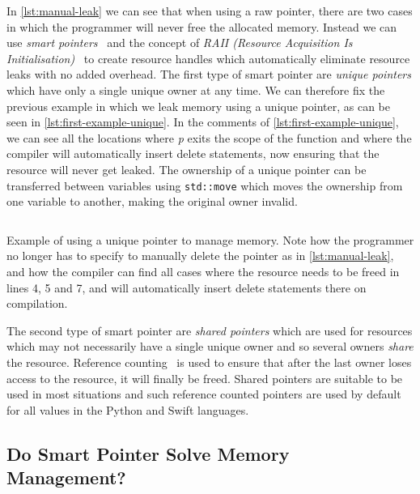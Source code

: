 \documentclass{proposal}
\begin{document}

    In \autoref{lst:manual-leak} we can see that when using a raw pointer, there are two cases in which the programmer will never free the allocated memory.
    Instead we can use \emph{smart pointers}~\cite{Dimov2003} and the concept of \emph{RAII (Resource Acquisition Is Initialisation)}~\cite{Stroustrup2000} to create resource handles which automatically eliminate resource leaks with no added overhead.
    The first type of smart pointer are \emph{unique pointers} which have only a single unique owner at any time.
    We can therefore fix the previous example in which we leak memory using a unique pointer, as can be seen in \autoref{lst:first-example-unique}.
    In the comments of \autoref{lst:first-example-unique}, we can see all the locations where \emph{p} exits the scope of the function and where the compiler will automatically insert delete statements, now ensuring that the resource will never get leaked.
    The ownership of a unique pointer can be transferred between variables using \texttt{std::move} which moves the ownership from one variable to another, making the original owner invalid.

    \begin{listing}
        \inputminted{c++}{code/first-example-unique.cpp}
        \caption{Example of using a unique pointer to manage memory. Note how the programmer no longer has to specify to manually delete the pointer as in \autoref{lst:manual-leak}, and how the compiler can find all cases where the resource needs to be freed in lines 4, 5 and 7, and will automatically insert delete statements there on compilation.}
        \label{lst:first-example-unique}
    \end{listing}

    The second type of smart pointer are \emph{shared pointers} which are used for resources which may not necessarily have a single unique owner and so several owners \emph{share} the resource.
    Reference counting~\cite{Collins1960} is used to ensure that after the last owner loses access to the resource, it will finally be freed.
    Shared pointers are suitable to be used in most situations and such reference counted pointers are used by default for all values in the Python and Swift languages.

    \subsection{Do Smart Pointer Solve Memory Management?}\label{subsec:do-smart-pointer-solve-memory-management?}
\end{document}
